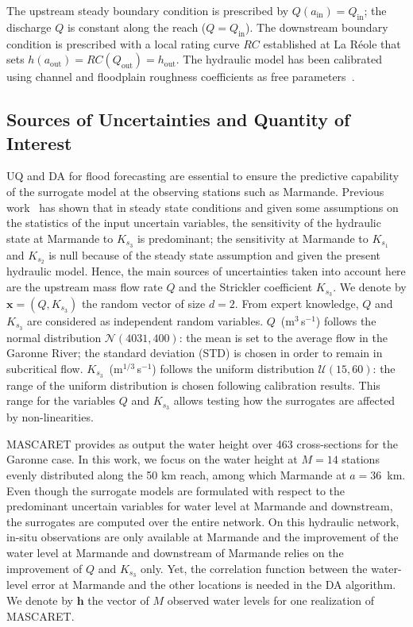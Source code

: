 The upstream steady boundary condition is prescribed by $Q(a_{\text{in}}) = Q_{\text{in}}$; the discharge $Q$ is constant along the reach ($Q = Q_{\text{in}}$). The downstream boundary condition is prescribed with a local rating curve $RC$ established at La R\'eole that sets $h(a_{\text{out}}) = RC(Q_{\text{out}}) = h_{\text{out}}$. The hydraulic model has been calibrated using channel and floodplain roughness coefficients as free parameters~\citep{besnard2011}. 

\subsection{Sources of Uncertainties and Quantity of Interest}\label{sec:database}

UQ and DA for flood forecasting are essential to ensure the predictive capability of the surrogate model at the observing stations such as Marmande. Previous work~\citep{elmocaydEMA} has shown that in steady state conditions and given some assumptions on the statistics of the input uncertain variables, the sensitivity of the hydraulic state at Marmande to $K_{s_3}$ is predominant; the sensitivity at Marmande to $K_{s_1}$ and $K_{s_2}$ is null because of the steady state assumption and given the present hydraulic model. Hence, the main sources of uncertainties taken into account here are the upstream mass flow rate $Q$ and the Strickler coefficient $K_{s_3}$. We denote by $\mathbf{x} = (Q, K_{s_3})$ the random vector of size $d = 2$. From expert knowledge, $Q$ and $K_{s_3}$ are considered as independent random variables. $Q$~(m$^3$\,s$^{-1}$) follows the normal distribution $\mathcal{N}(4031,400)$: the mean is set to the average flow in the Garonne River; the standard deviation (STD) is chosen in order to remain in subcritical flow. $K_{s_3}$~(m$^{1/3}$\,s$^{-1}$) follows the uniform distribution $\mathcal{U}(15,60)$: the range of the uniform distribution is chosen following calibration results. This range for the variables $Q$ and $K_{s_3}$ allows testing how the surrogates are affected by non-linearities. 

MASCARET provides as output the water height over 463 cross-sections for the Garonne case. In this work, we focus on the water height at $M = 14$ stations evenly distributed along the 50 km reach, among which Marmande at $a = 36$~km. Even though the surrogate models are formulated with respect to the predominant uncertain variables for water level at Marmande and downstream, the surrogates are computed over the entire network. On this hydraulic network, in-situ observations are only available at Marmande and the improvement of the water level at Marmande and downstream of Marmande
relies on the improvement of $Q$ and $K_{s_3}$ only. Yet, the correlation function between the water-level error at Marmande and the other locations is needed in the DA algorithm. We denote by $\mathbf{h}$ the vector of $M$ observed water levels for one realization of MASCARET.

